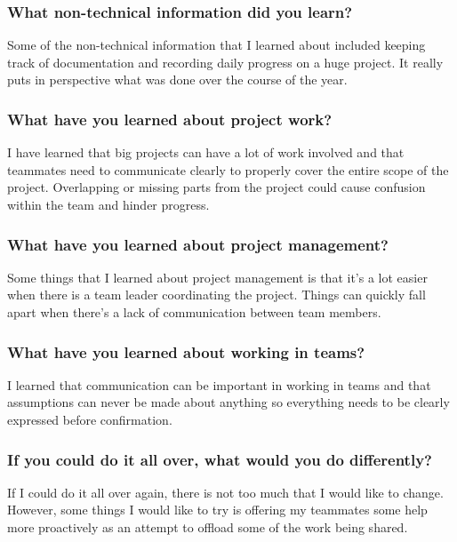 \subsubsection{What non-technical information did you learn?}
\noindent Some of the non-technical information that I learned about included keeping track of documentation and recording daily progress on a huge project. It really puts in perspective what was done over the course of the year. \\ 

\subsubsection{What have you learned about project work?}
\noindent I have learned that big projects can have a lot of work involved and that teammates need to communicate clearly to properly cover the entire scope of the project. Overlapping or missing parts from the project could cause confusion within the team and hinder progress.\\ 

\subsubsection{What have you learned about project management?}
\noindent Some things that I learned about project management is that it’s a lot easier when there is a team leader coordinating the project. Things can quickly fall apart when there’s a lack of communication between team members.\\

\subsubsection{What have you learned about working in teams?}
\noindent I learned that communication can be important in working in teams and that assumptions can never be made about anything so everything needs to be clearly expressed before confirmation.\\

\subsubsection{If you could do it all over, what would you do differently?}
\noindent If I could do it all over again, there is not too much that I would like to change. However, some things I would like to try is offering my teammates some help more proactively as an attempt to offload some of the work being shared.\\

